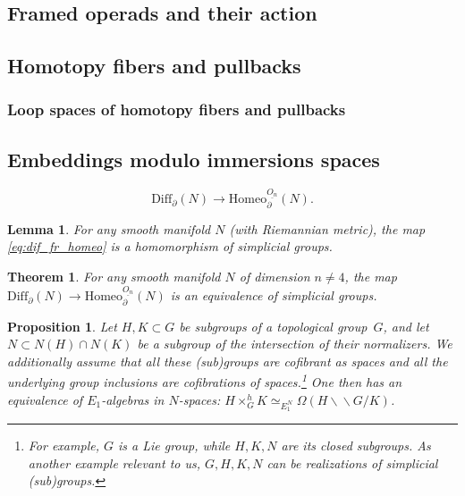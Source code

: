 \documentclass[10pt,a4paper]{amsart}
\newtheorem{lemma}{Lemma}
\newtheorem{theorem}{Theorem}
\newtheorem{proposition}{Proposition}
\newcommand{\Diff}{\mathrm{Diff}}
\newcommand{\Homeo}{\mathrm{Homeo}}
\newcommand{\bbslash}{\backslash\!\!\backslash}
\begin{document}
\subsection{Framed operads and their action}\label{ss:fr_operads}

\subsection{Homotopy fibers and pullbacks}\label{ss:hofib}

\subsubsection{Loop spaces of  homotopy fibers and pullbacks}\label{sss:loops}

\subsection{Embeddings modulo immersions spaces}\label{ss:modulo} 

\begin{equation}\label{eq:dif_fr_homeo}
\Diff_\partial(N)\to \Homeo_\partial^{\underline{O_n}}(N).
\end{equation}

\begin{lemma}\label{l:dif_fr_homeo}
For any smooth manifold $N$ (with Riemannian metric), the map \eqref{eq:dif_fr_homeo} is a homomorphism of simplicial groups.
\end{lemma}

\begin{theorem}\label{th:diff_compos}
For any smooth manifold $N$ of dimension $n\neq 4$, the map $\Diff_\partial(N)\to \Homeo_\partial^{\underline{O_n}}(N)$  is an equivalence of simplicial groups.
\end{theorem}

\begin{proposition}\label{l:E1equiv}
Let $H,K\subset G$ be subgroups of a topological group~$G$, and let $N\subset N(H)\cap N(K)$ be a subgroup of the intersection of their normalizers. We additionally assume that all these (sub)groups are cofibrant as spaces
and all the underlying group inclusions are cofibrations of spaces.\footnote{For example, $G$ is a Lie group, while $H,K,N$ are its closed subgroups. As another example relevant to us, $G,H,K,N$ can be realizations of simplicial (sub)groups.} One then has an equivalence
of $E_1$-algebras in $N$-spaces:
$H\times_G^h K\simeq_{E_1^N}\Omega\left(H\bbslash G/K\right)$.
\end{proposition}
\end{document}

